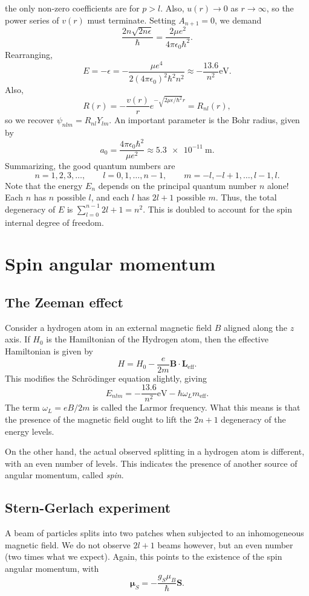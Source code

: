 \documentclass[11pt]{article}
\newcommand\ve[1]{\boldsymbol{#1}}
\def\vL{\ve{L}}
\theoremstyle{definition}
\theoremstyle{remark}
\numberwithin{equation}{section}
\begin{document}
    the only non-zero coefficients are for $p > l$. Also, $u(r) \to 0$ as $r \to
    \infty$, so the power series of $v(r)$ must terminate. Setting $A_{n + 1} = 0$,
    we demand \[
        \frac{2n\sqrt{2n\epsilon}}{\hbar} = \frac{2\mu e^2}{4\pi\epsilon_0 \hbar^2}.
    \] Rearranging, \[
        E = -\epsilon = -\frac{\mu e^4}{2(4\pi\epsilon_0)^2\hbar^2 n^2} \approx
        -\frac{13.6}{n^2}\si{\eV}.
    \] Also, \[
        R(r) = -\frac{v(r)}{r}e^{-\sqrt{2\mu\epsilon / \hbar^2}r} = R_{nl}(r),
    \] so we recover $\psi_{nlm} = R_{nl}Y_{lm}$. An important parameter is the Bohr
    radius, given by \[
        a_0 = \frac{4\pi\epsilon_0 \hbar^2}{\mu e^2} \approx \SI{5.3e-11}{\m}.
    \] Summarizing, the good quantum numbers are \[
        n = 1, 2, 3, \dots, \qquad l = 0, 1, \dots, n - 1, \qquad m = -l, -l + 1,
        \dots, l - 1, l.
    \] Note that the energy $E_n$ depends on the principal quantum number $n$ alone!
    Each $n$ has $n$ possible $l$, and each $l$ has $2l + 1$ possible $m$.
    Thus, the total degeneracy of $E$ is $\sum_{l = 0}^{n - 1} 2l + 1 = n^2$. This
    is doubled to account for the spin internal degree of freedom.

    \section{Spin angular momentum}
    \subsection{The Zeeman effect}
    Consider a hydrogen atom in an external magnetic field $B$ aligned along the $z$
    axis. If $H_0$ is the Hamiltonian of the Hydrogen atom, then the effective
    Hamiltonian is given by \[
        H = H_0 - \frac{e}{2m}\ve{B}\cdot\vL_{\text{eff}}.
    \] This modifies the Schr\"odinger equation slightly, giving \[
        E_{nlm} = -\frac{13.6}{n^2}\si{\eV} - \hbar\omega_Lm_{\text{eff}}.
    \] The term $\omega_L = eB / 2m$ is called the Larmor frequency. What this means
    is that the presence of the magnetic field ought to lift the $2n + 1$ degeneracy
    of the energy levels.

    On the other hand, the actual observed splitting in a hydrogen atom is
    different, with an even number of levels. This indicates the presence of another
    source of angular momentum, called \textit{spin}. 

    \subsection{Stern-Gerlach experiment}
    A beam of particles splits into two patches when subjected to an inhomogeneous
    magnetic field. We do not observe $2l + 1$ beams however, but an even number
    (two times what we expect). Again, this points to the existence of the spin
    angular momentum, with \[
        \ve{\mu}_S = -\frac{g_S\mu_B}{\hbar}\ve{S}.
    \] 
\end{document}
